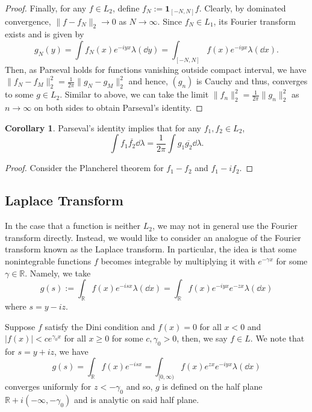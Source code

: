 \documentclass[]{article}
\theoremstyle{definition}
\newtheorem{corollary}{Corollary}[theorem]
\theoremstyle{definition}
\begin{document}
\begin{proof}
  Finally, for any \(f \in L_2\), define \(f_N := \mathbf{1}_{[-N, N]}f\). Clearly, 
  by dominated convergence, \(\|f - f_N\|_2 \to 0\) as \(N \to \infty\). 
  Since \(f_N \in L_1\), its Fourier transform exists and is given by
  \[g_N(y) = \int f_N(x)e^{-iyx}\lambda(\dd y) = \int_{[-N, N]} f(x)e^{-iyx}\lambda(\dd x).\]
  Then, as Parseval holds for functions vanishing outside compact interval, 
  we have \(\|f_N - f_M\|_2^2 = \frac{1}{2\pi}\|g_N - g_M\|_2^2\) and hence, 
  \((g_n)\) is Cauchy and thus, converges to some \(g \in L_2\). Similar to above, 
  we can take the limit \(\|f_n\|^2_2 = \frac{1}{2\pi}\|g_n\|^2_2\) as 
  \(n \to \infty\) on both sides to obtain Parseval's identity.
\end{proof}

\begin{corollary}
  Parseval's identity implies that for any \(f_1, f_2 \in L_2\), 
  \[\int f_1 \overline{f_2} \dd \lambda = 
    \frac{1}{2\pi}\int g_1 \overline{g_2} \dd \lambda.\]
\end{corollary}
\begin{proof}
  Consider the Plancherel theorem for \(f_1 - f_2\) and \(f_1 - if_2\).
\end{proof}

\subsection{Laplace Transform}

In the case that a function is neither \(L_2\), we may not in general
use the Fourier transform directly. Instead, we would like to consider an 
analogue of the Fourier transform known as the Laplace transform.
In particular, the idea is that some nonintegrable functions \(f\) becomes 
integrable by multiplying it with \(e^{-\gamma x}\) for some 
\(\gamma \in \mathbb{R}\). Namely, we take 
\[g(s) := \int_{\mathbb{R}} f(x)e^{-isx}\lambda(\dd x) 
  = \int_{\mathbb{R}}f(x)e^{-iyx}e^{-zx}\lambda(\dd x)\]
where \(s = y - i z\).

Suppose \(f\) satisfy the Dini condition and \(f(x) = 0\) for all \(x < 0\) 
and \(|f(x)| < ce^{\gamma_0 x}\) for all \(x \ge 0\) for some \(c, \gamma_0 > 0\),
then, we say \(f \in L\). We note that for \(s = y + iz\), we have
\[g(s) = \int_{\mathbb{R}} f(x) e^{-isx} = 
  \int_{[0, \infty)} f(x)e^{zx}e^{-iyx}\lambda(\dd x)\]
converges uniformly for \(z < -\gamma_0\) and so, \(g\) is defined 
on the half plane \(\mathbb{R} + i(-\infty, -\gamma_0)\) and is analytic on said 
half plane.
\end{document}
